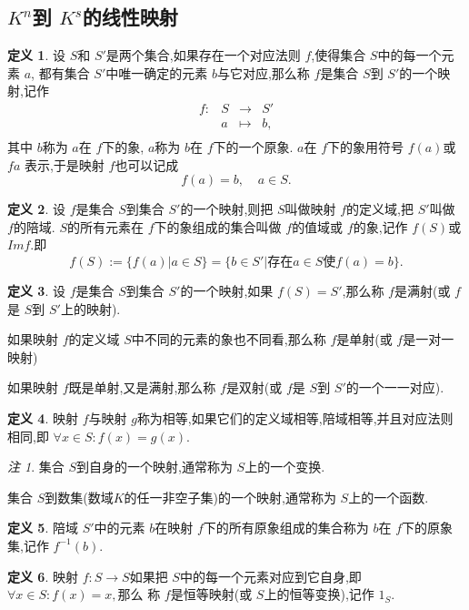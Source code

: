 \documentclass[a4paper,11pt]{article}%
\theoremstyle{remark}
\newtheorem*{remark}{注}
\theoremstyle{definition}
\theoremstyle{definition}
\newtheorem*{definition}{定义}
\theoremstyle{plain}
\begin{document}
\subsection{$K^n$到 $K^s$的线性映射}
\begin{definition}
    设 $S$和 $S'$是两个集合,如果存在一个对应法则 $f$,使得集合 $S$中的每一个元素 $a$,
    都有集合 $S'$中唯一确定的元素 $b$与它对应,那么称 $f$是集合 $S$到 $S'$的一个映射,记作
    \[
    \begin{array}{rrcl}
    f : &  S & \longrightarrow  & S' \\
                   &  a  & \longmapsto    & b, \\
    \end{array}
    \]
    其中 $b$称为 $a$在 $f$下的象, $a$称为 $b$在 $f$下的一个原象. $a$在 $f$下的象用符号 $f(a)$或 $fa$
    表示,于是映射 $f$也可以记成
    \[f(a)=b,\phantom{aa}a\in S.\]
\end{definition}
\begin{definition}
    设 $f$是集合 $S$到集合 $S'$的一个映射,则把 $S$叫做映射 $f$的定义域,把
    $S'$叫做 $f$的陪域. $S$的所有元素在 $f$下的象组成的集合叫做 $f$的值域或
    $f$的象,记作 $f(S)$或 $Imf.$即
    \[f(S):=\{f(a)\vert a\in S\}=\{b\in S'\vert \text{存在}a\in S \text{使}f(a)=b\}.\]
\end{definition}
\begin{definition}
    设 $f$是集合 $S$到集合 $S'$的一个映射,如果 $f(S)=S'$,那么称 $f$是满射(或 $f$是 $S$到 $S'$上的映射).

    如果映射 $f$的定义域 $S$中不同的元素的象也不同看,那么称 $f$是单射(或 $f$是一对一映射)

    如果映射 $f$既是单射,又是满射,那么称 $f$是双射(或 $f$是 $S$到 $S'$的一个一一对应).
\end{definition}
\begin{definition}
    映射 $f$与映射 $g$称为相等,如果它们的定义域相等,陪域相等,并且对应法则相同,即 $\forall x \in S:f(x)=g(x)$.
\end{definition}
\begin{remark}
    集合 $S$到自身的一个映射,通常称为 $S$上的一个变换.

    集合 $S$到数集(数域$K$的任一非空子集)的一个映射,通常称为 $S$上的一个函数.
\end{remark}
\begin{definition}
    陪域 $S'$中的元素 $b$在映射 $f$下的所有原象组成的集合称为 $b$在 $f$下的原象集,记作 $f^{-1}(b).$
\end{definition}
\begin{definition}
    映射 $f:S\rightarrow S$如果把 $S$中的每一个元素对应到它自身,即 $\forall x\in S:f(x)=x,$那么
    称 $f$是恒等映射(或 $S$上的恒等变换),记作 $1_S$.
\end{definition}
\end{document}
